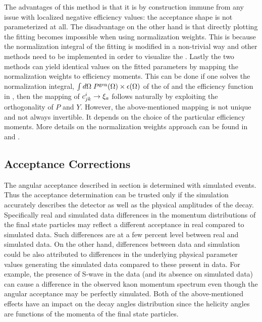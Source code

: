 The advantages of this method is that it is by construction immune from any issue with localized negative efficiency values:
the acceptance shape is not parameterized at all. The disadvantage on the other hand is that directly
plotting the fitting \pdf becomes impossible when using normalization weights. This is because the normalization integral
of the fitting \pdf is modified in a non-trivial way and other methods need to be implemented in order to visualize the \pdf.
Lastly the two methods can yield identical values on the
fitted parameters by mapping the normalization weights to efficiency moments. This can be done if one solves the normalization integral,
$\int d\Omega\;{P^{\text{gen}}(\Omega)}\times\epsilon(\Omega)$ of the \pdf of  and the efficiency function in ,
then the mapping of $c^{i}_{jk} \rightarrow \xi_a$ follows naturally by exploiting the orthogonality of $P$ and $Y$.
However, the above-mentioned mapping is not unique and not always invertible. It depends on the choice of the particular
efficiency moments. More details on the normalization weights approach can be found in \cite{jeroenThesis} and \cite{tristanThesis}.

\subsection{Acceptance Corrections}
\label{Accceptance_Corrections}
The angular acceptance described in section  is determined with simulated \BsJpsiKst events.
Thus the acceptance determination can be trusted only if the simulation accurately describes the detector as well as the
physical amplitudes of the \BsJpsiKst decay. Specifically real and simulated data differences in the momentum distributions
of the final state particles may reflect a different acceptance in real compared to simulated data.
Such differences are at a few percent level between real and simulated data.
On the other hand, differences between data and simulation could be also attributed to
differences in the underlying physical parameter values generating the simulated data compared to these
present in data. For example, the presence of S-wave in the data (and its absence on simulated data)
can cause a difference in the observed kaon momentum spectrum even though the angular acceptance may be perfectly simulated.
Both of the above-mentioned effects have an impact on the decay angles distribution since the helicity angles are functions
of the momenta of the final state particles.

